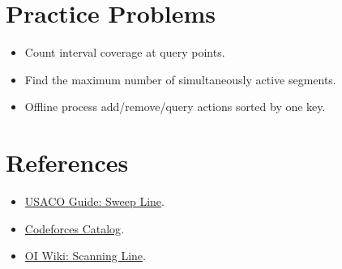 \section*{Practice Problems}

\begin{itemize}
  \item Count interval coverage at query points.
  \item Find the maximum number of simultaneously active segments.
  \item Offline process add/remove/query actions sorted by one key.
\end{itemize}

\section*{References}

\begin{itemize}
  \item \href{https://usaco.guide/plat/sweep-line}{USACO Guide: Sweep Line}.
  \item \href{https://codeforces.com/catalog}{Codeforces Catalog}.
  \item \href{https://en.oi-wiki.org/geometry/scanning/}{OI Wiki: Scanning Line}.
\end{itemize}
